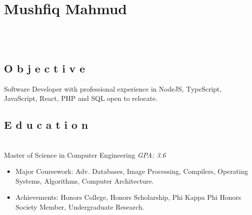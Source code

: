 \documentclass[2pt]{resume}
\begin{document}
\section{Mushfiq Mahmud}

\begin{center}
 \hspace{2mm}
\address{Tampa, FL} \hspace{2mm}
 \\

 \hspace{1mm}
 \hspace{1mm}
 \\
\end{center}


\subsection{O b j e c t i v e}
\small Software Developer with professional experience in NodeJS, TypeScript, JavaScript, React, PHP and SQL open to relocate.


\subsection{E d u c a t i o n}
 \\
Master of Science in Computer Engineering \hfill \emph{GPA: 3.6}

\begin{itemize}
\item \small Major Coursework: Adv. Databases, Image Processing, Compilers, Operating Systems, Algorithms, Computer Architecture.
\item \small Achievements: Honors College, Honors Scholarship, Phi Kappa Phi Honors Society Member, Undergraduate Research.
\end{itemize}

\end{document}
